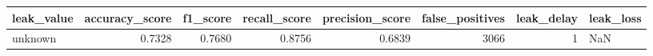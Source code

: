 \begin{tabular}{lrrrrrrl}
\toprule
leak\_value & accuracy\_score & f1\_score & recall\_score & precision\_score & false\_positives & leak\_delay & leak\_loss \\
\midrule
unknown & 0.7328 & 0.7680 & 0.8756 & 0.6839 & 3066 & 1 & NaN \\
\bottomrule
\end{tabular}
